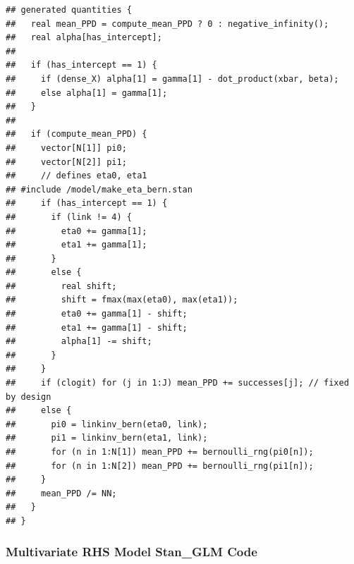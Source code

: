 \documentclass[
]{article}
\newenvironment{Shaded}{\begin{snugshade}}{\end{snugshade}}
\newcommand{\KeywordTok}[1]{\textcolor[rgb]{0.13,0.29,0.53}{\textbf{#1}}}
\newcommand{\NormalTok}[1]{#1}
\newcommand{\OperatorTok}[1]{\textcolor[rgb]{0.81,0.36,0.00}{\textbf{#1}}}
\begin{document}
\begin{verbatim}
## generated quantities {
##   real mean_PPD = compute_mean_PPD ? 0 : negative_infinity();
##   real alpha[has_intercept];
##   
##   if (has_intercept == 1) {
##     if (dense_X) alpha[1] = gamma[1] - dot_product(xbar, beta);
##     else alpha[1] = gamma[1];
##   }
##   
##   if (compute_mean_PPD) {
##     vector[N[1]] pi0;
##     vector[N[2]] pi1;
##     // defines eta0, eta1
## #include /model/make_eta_bern.stan
##     if (has_intercept == 1) {
##       if (link != 4) {
##         eta0 += gamma[1];
##         eta1 += gamma[1];
##       }      
##       else {
##         real shift;
##         shift = fmax(max(eta0), max(eta1));
##         eta0 += gamma[1] - shift;
##         eta1 += gamma[1] - shift;
##         alpha[1] -= shift;
##       }
##     }
##     if (clogit) for (j in 1:J) mean_PPD += successes[j]; // fixed by design
##     else {
##       pi0 = linkinv_bern(eta0, link);
##       pi1 = linkinv_bern(eta1, link);
##       for (n in 1:N[1]) mean_PPD += bernoulli_rng(pi0[n]);
##       for (n in 1:N[2]) mean_PPD += bernoulli_rng(pi1[n]);
##     }
##     mean_PPD /= NN;
##   }
## }
\end{verbatim}

\hypertarget{multivariate-rhs-model-stan_glm-code}{%
\subsubsection{Multivariate RHS Model Stan\_GLM
Code}\label{multivariate-rhs-model-stan_glm-code}}

\begin{Shaded}
\end{Shaded}
\end{document}
